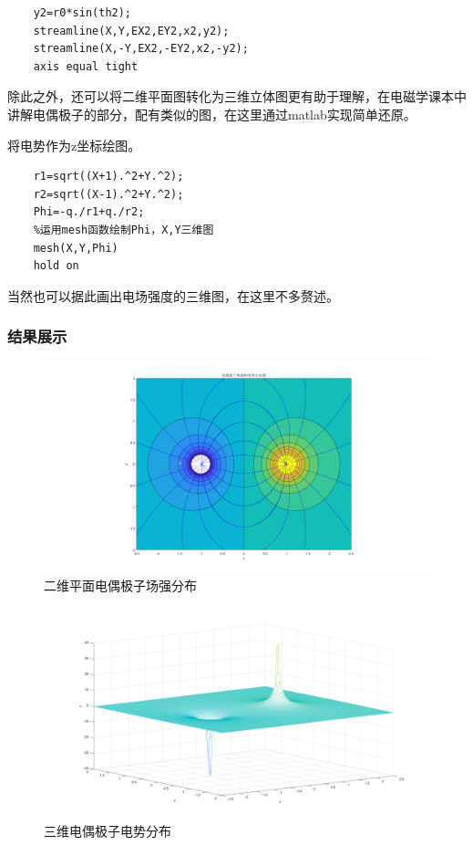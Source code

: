 \documentclass[UTF8]{article}
\numberwithin{figure}{subsection}
\numberwithin{table}{subsection}
\begin{document}
\begin{multicols}{2}
\begin{lstlisting}
    y2=r0*sin(th2);
    streamline(X,Y,EX2,EY2,x2,y2);
    streamline(X,-Y,EX2,-EY2,x2,-y2);
    axis equal tight
    \end{lstlisting}
    \par 除此之外，还可以将二维平面图转化为三维立体图更有助于理解，在电磁学课本中讲解电偶极子的部分，配有类似的图，在这里通过matlab实现简单还原。
    \par 将电势作为z坐标绘图。
    \begin{lstlisting}
    r1=sqrt((X+1).^2+Y.^2);
    r2=sqrt((X-1).^2+Y.^2);
    Phi=-q./r1+q./r2;
    %运用mesh函数绘制Phi，X,Y三维图
    mesh(X,Y,Phi)
    hold on 
    \end{lstlisting}
	\par 当然也可以据此画出电场强度的三维图，在这里不多赘述。
    \subsubsection{结果展示}
    \begin{figure}[H]
    	\centering
    	\includegraphics[scale=0.15]{电偶极子场强分布.png}
    	\caption{二维平面电偶极子场强分布}
    \end{figure}
	\begin{figure}[H]
		\centering
		\includegraphics[scale=0.15]{立体图.png}
		\caption{三维电偶极子电势分布}
	\end{figure}

\end{multicols}
\end{document}
